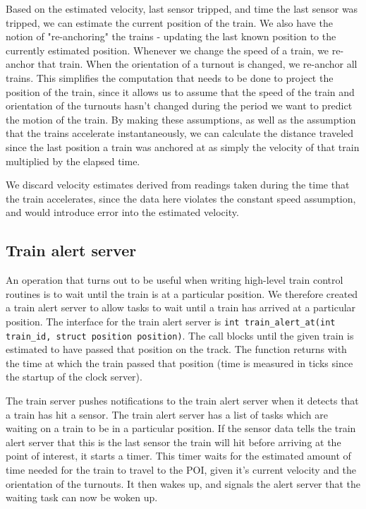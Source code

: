 \documentclass[titlepage]{article}
\begin{document}
Based on the estimated velocity, last sensor tripped, and time the last sensor
was tripped, we can estimate the current position of the train.
We also have the notion of "re-anchoring" the trains - updating the last
known position to the currently estimated position.
Whenever we change the speed of a train, we re-anchor that train.
When the orientation of a turnout is changed, we re-anchor all trains.
This simplifies the computation that needs to be done to project the position
of the train, since it allows us to assume that the speed of the train and
orientation of the turnouts hasn't changed during the period we want to predict
the motion of the train.
By making these assumptions, as well as the assumption that the trains accelerate
instantaneously, we can calculate the distance traveled since the last position
a train was anchored at as simply the velocity of that train multiplied by
the elapsed time.

We discard velocity estimates derived from readings taken during the time
that the train accelerates, since the data here violates the constant speed
assumption, and would introduce error into the estimated velocity.

\subsection{Train alert server}
An operation that turns out to be useful when writing high-level train control
routines is to wait until the train is at a particular position.
We therefore created a train alert server to allow tasks to wait until a train
has arrived at a particular position.
The interface for the train alert server is
\texttt{int train\_alert\_at(int train\_id, struct position position)}.
The call blocks until the given train is estimated to have passed that position
on the track.
The function returns with the time at which the train passed that position
(time is measured in ticks since the startup of the clock server).

The train server pushes notifications to the train alert server when
it detects that a train has hit a sensor.
The train alert server has a list of tasks which are waiting on a train
to be in a particular position.
If the sensor data tells the train alert server that this is the last
sensor the train will hit before arriving at the point of interest,
it starts a timer.
This timer waits for the estimated amount of time needed for the train
to travel to the POI, given it's current velocity and the orientation
of the turnouts.
It then wakes up, and signals the alert server that the waiting task can
now be woken up.
\end{document}
